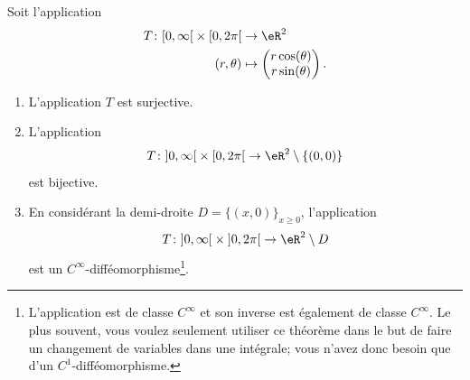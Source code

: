 \begin{theorem}     \label{THOooBETSooXSQhdX}
	Soit l'application
	\begin{equation}
		\begin{aligned}
			T\colon \mathopen[ 0 , \infty \mathclose[\times \mathopen[ 0 , 2\pi \mathclose[ & \to \eR^2              \\
			(r,\theta)                                                                      & \mapsto \begin{pmatrix}
				                                                                                          r\cos(\theta) \\
				                                                                                          r\sin(\theta)
			                                                                                          \end{pmatrix}.
		\end{aligned}
	\end{equation}
	\begin{enumerate}
		\item       \label{ITEMooNGOKooFCXmwy}
		      L'application \( T\) est surjective.
		\item       \label{ITEMooMCIOooJiBvug}
		      L'application
		      \begin{equation}
			      T\colon \mathopen] 0 , \infty \mathclose[\times \mathopen[ 0 , 2\pi \mathclose[\to \eR^2\setminus\{ (0,0) \}
		      \end{equation}
		      est bijective.
		\item       \label{ITEMooZFRGooQPDUtX}
		      En considérant la demi-droite \( D=\{ (x,0) \}_{x\geq 0}\), l'application
		      \begin{equation}
			      T\colon \mathopen] 0 , \infty \mathclose[\times \mathopen] 0 , 2\pi \mathclose[\to \eR^2\setminus D
		      \end{equation}
		      est un \(  C^{\infty}\)-difféomorphisme\footnote{L'application est de classe \(  C^{\infty}\) et son inverse est également de classe \(  C^{\infty}\). Le plus souvent, vous voulez seulement utiliser ce théorème dans le but de faire un changement de variables dans une intégrale; vous n'avez donc besoin que d'un \( C^1\)-difféomorphisme.}.
	\end{enumerate}
\end{theorem}

